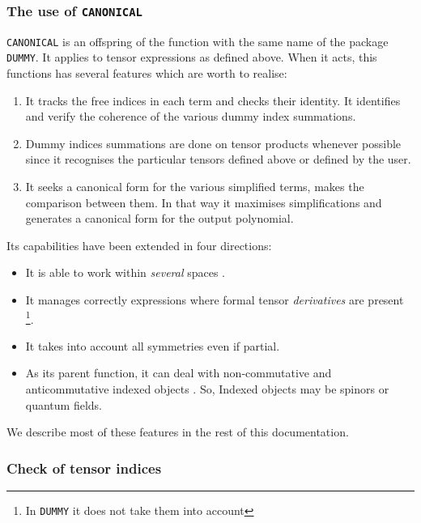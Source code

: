 \subsubsection{The use of \texttt{CANONICAL}}

\texttt{CANONICAL}  is an offspring of the function
with the same name of the package \texttt{DUMMY}.
It applies to tensor expressions as defined above.
When it acts, this functions has several features which are
worth to realise:
\begin{enumerate}
\item It tracks the free indices in each term  and checks their
identity.  It identifies and verify the coherence
of the various dummy index summations.
\item Dummy indices summations are done on tensor products whenever
possible since it recognises the particular tensors
defined above or defined by the user.
\item It seeks a canonical form for the
various simplified terms, makes the comparison between them.
In that way it maximises simplifications and generates a canonical form
for the output polynomial.
\end{enumerate}
Its capabilities  have been extended in four directions:
\begin{itemize}
\item It is able to work within \emph{several} spaces%
.
\item It manages correctly expressions where
formal tensor \emph{derivatives} are present%
\footnote{In \texttt{DUMMY} it does not take them into account}.
\item It takes into account all symmetries even if partial.
\item As its parent function, it can deal with non-commutative
and anticommutative indexed objects%
.
So, Indexed objects may be spinors%
 or quantum fields.
\end{itemize}
We describe most of these features in the rest of this
documentation.
\subsubsection{Check of tensor indices}

